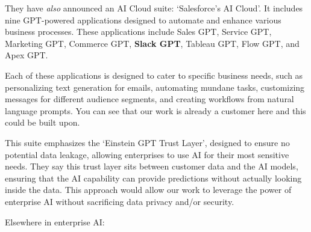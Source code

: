 They have \textit{also} announced an AI Cloud suite: `Salesforce's AI Cloud'. It includes nine GPT-powered applications designed to automate and enhance various business processes. These applications include Sales GPT, Service GPT, Marketing GPT, Commerce GPT, \textbf{Slack GPT}, Tableau GPT, Flow GPT, and Apex GPT. \par
Each of these applications is designed to cater to specific business needs, such as personalizing text generation for emails, automating mundane tasks, customizing messages for different audience segments, and creating workflows from natural language prompts. You can see that our work is already a customer here and this could be built upon.\par 
This suite emphasizes the `Einstein GPT Trust Layer', designed to ensure no potential data leakage, allowing enterprises to use AI for their most sensitive needs. They say this trust layer sits between customer data and the AI models, ensuring that the AI capability can provide predictions without actually looking inside the data. This approach would allow our work to leverage the power of enterprise AI without sacrificing data privacy and/or security.\par
Elsewhere in enterprise AI:
